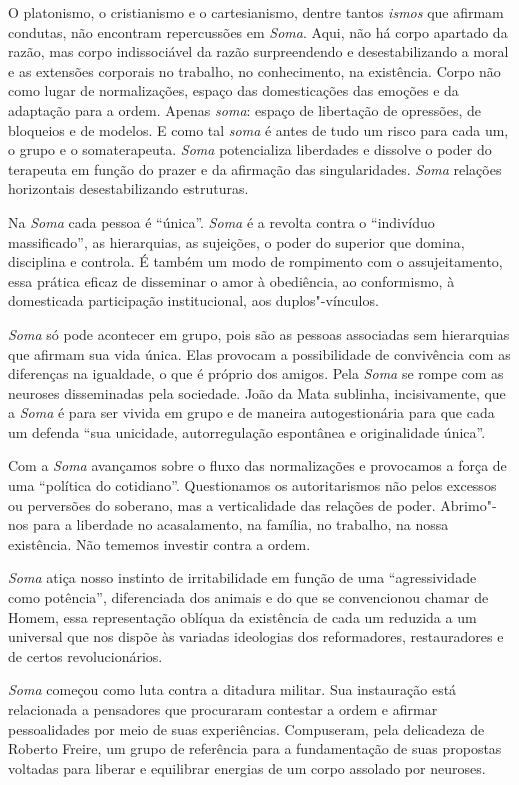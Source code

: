 O platonismo, o cristianismo e o cartesianismo, dentre tantos
\emph{ismos} que afirmam condutas, não encontram repercussões em
\emph{Soma}. Aqui, não há corpo apartado da razão, mas corpo
indissociável da razão surpreendendo e desestabilizando a moral e as
extensões corporais no trabalho, no conhecimento, na existência. Corpo
não como lugar de normalizações, espaço das domesticações das emoções e
da adaptação para a ordem. Apenas \emph{soma}: espaço de libertação de
opressões, de bloqueios e de modelos. E como tal \emph{soma} é antes de
tudo um risco para cada um, o grupo e o somaterapeuta. \emph{Soma}
potencializa liberdades e dissolve o poder do terapeuta em função do
prazer e da afirmação das singularidades. \emph{Soma} relações
horizontais desestabilizando estruturas.

Na \emph{Soma} cada pessoa é ``única''. \emph{Soma} é a revolta contra o
``indivíduo massificado'', as hierarquias, as sujeições, o poder do
superior que domina, disciplina e controla. É também um modo de
rompimento com o assujeitamento, essa prática eficaz de disseminar o
amor à obediência, ao conformismo, à domesticada participação
institucional, aos duplos"-vínculos.

\emph{Soma} só pode acontecer em grupo, pois são as pessoas associadas
sem hierarquias que afirmam sua vida única. Elas provocam a
possibilidade de convivência com as diferenças na igualdade, o que é
próprio dos amigos. Pela \emph{Soma} se rompe com as neuroses
disseminadas pela sociedade. João da Mata sublinha, incisivamente, que a
\emph{Soma} é para ser vivida em grupo e de maneira autogestionária para
que cada um defenda ``sua unicidade, autorregulação espontânea e
originalidade única''.

Com a \emph{Soma} avançamos sobre o fluxo das normalizações e provocamos
a força de uma ``política do cotidiano''. Questionamos os autoritarismos
não pelos excessos ou perversões do soberano, mas a verticalidade das
relações de poder. Abrimo"-nos para a liberdade no acasalamento, na
família, no trabalho, na nossa existência. Não tememos investir contra a
ordem.

\emph{Soma} atiça nosso instinto de irritabilidade em função de uma
``agressividade como potência'', diferenciada dos animais e do que se
convencionou chamar de Homem, essa representação oblíqua da existência
de cada um reduzida a um universal que nos dispõe às variadas ideologias
dos reformadores, restauradores e de certos revolucionários.

\emph{Soma} começou como luta contra a ditadura militar. Sua instauração
está relacionada a pensadores que procuraram contestar a ordem e afirmar
pessoalidades por meio de suas experiências. Compuseram, pela delicadeza
de Roberto Freire, um grupo de referência para a fundamentação de suas
propostas voltadas para liberar e equilibrar energias de um corpo
assolado por neuroses.


